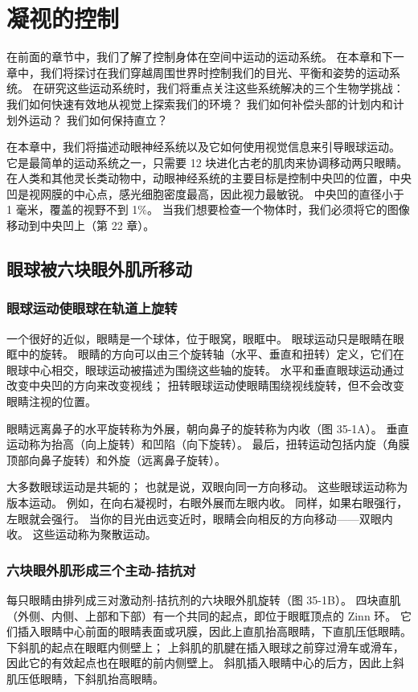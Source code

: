 \chapter{凝视的控制} \label{chap:chap35}

在前面的章节中，我们了解了控制身体在空间中运动的运动系统。 在本章和下一章中，我们将探讨在我们穿越周围世界时控制我们的目光、平衡和姿势的运动系统。 在研究这些运动系统时，我们将重点关注这些系统解决的三个生物学挑战：我们如何快速有效地从视觉上探索我们的环境？ 我们如何补偿头部的计划内和计划外运动？ 我们如何保持直立？

在本章中，我们将描述动眼神经系统以及它如何使用视觉信息来引导眼球运动。 它是最简单的运动系统之一，只需要 12 块进化古老的肌肉来协调移动两只眼睛。 在人类和其他灵长类动物中，动眼神经系统的主要目标是控制中央凹的位置，中央凹是视网膜的中心点，感光细胞密度最高，因此视力最敏锐。 中央凹的直径小于 1 毫米，覆盖的视野不到 1\%。 当我们想要检查一个物体时，我们必须将它的图像移动到中央凹上（第 22 章）。

\section{眼球被六块眼外肌所移动}
\subsection{眼球运动使眼球在轨道上旋转}
一个很好的近似，眼睛是一个球体，位于眼窝，眼眶中。 眼球运动只是眼睛在眼眶中的旋转。 眼睛的方向可以由三个旋转轴（水平、垂直和扭转）定义，它们在眼球中心相交，眼球运动被描述为围绕这些轴的旋转。 水平和垂直眼球运动通过改变中央凹的方向来改变视线； 扭转眼球运动使眼睛围绕视线旋转，但不会改变眼睛注视的位置。

眼睛远离鼻子的水平旋转称为外展，朝向鼻子的旋转称为内收（图 35-1A）。 垂直运动称为抬高（向上旋转）和凹陷（向下旋转）。 最后，扭转运动包括内旋（角膜顶部向鼻子旋转）和外旋（远离鼻子旋转）。

大多数眼球运动是共轭的； 也就是说，双眼向同一方向移动。 这些眼球运动称为版本运动。 例如，在向右凝视时，右眼外展而左眼内收。 同样，如果右眼强行，左眼就会强行。 当你的目光由远变近时，眼睛会向相反的方向移动——双眼内收。 这些运动称为聚散运动。

\subsection{六块眼外肌形成三个主动-拮抗对}
每只眼睛由排列成三对激动剂-拮抗剂的六块眼外肌旋转（图 35-1B）。 四块直肌（外侧、内侧、上部和下部）有一个共同的起点，即位于眼眶顶点的 Zinn 环。 它们插入眼睛中心前面的眼睛表面或巩膜，因此上直肌抬高眼睛，下直肌压低眼睛。 下斜肌的起点在眼眶内侧壁上； 上斜肌的肌腱在插入眼球之前穿过滑车或滑车，因此它的有效起点也在眼眶的前内侧壁上。 斜肌插入眼睛中心的后方，因此上斜肌压低眼睛，下斜肌抬高眼睛。

